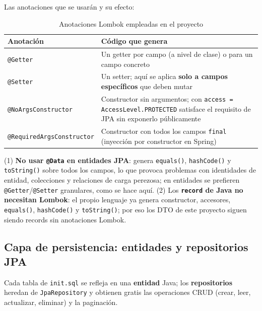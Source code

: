 \documentclass[11pt,a4paper]{article}
\begin{document}
Las anotaciones que se usarán y su efecto:

\begin{table}[h!]
\centering
\caption{Anotaciones Lombok empleadas en el proyecto}
\small
\begin{tabular}{l p{9.6cm}}
\toprule
\textbf{Anotación} & \textbf{Código que genera} \\
\midrule
\texttt{@Getter} & Un getter por campo (a nivel de clase) o para un campo concreto \\
\texttt{@Setter} & Un setter; aquí se aplica \textbf{solo a campos específicos} que deben mutar \\
\texttt{@NoArgsConstructor} & Constructor sin argumentos; con \texttt{access = AccessLevel.PROTECTED} satisface el requisito de JPA sin exponerlo públicamente \\
\texttt{@RequiredArgsConstructor} & Constructor con todos los campos \texttt{final} (inyección por constructor en Spring) \\
\bottomrule
\end{tabular}
\end{table}

\begin{cajaalerta}
(1) \textbf{No usar \texttt{@Data} en entidades JPA}: genera \texttt{equals()}, \texttt{hashCode()} y \texttt{toString()} sobre todos los campos, lo que provoca problemas con identidades de entidad, colecciones y relaciones de carga perezosa; en entidades se prefieren \texttt{@Getter}/\texttt{@Setter} granulares, como se hace aquí. (2) Los \textbf{\texttt{record} de Java no necesitan Lombok}: el propio lenguaje ya genera constructor, accesores, \texttt{equals()}, \texttt{hashCode()} y \texttt{toString()}; por eso los DTO de este proyecto siguen siendo records sin anotaciones Lombok.
\end{cajaalerta}

\subsection{Capa de persistencia: entidades y repositorios JPA}

Cada tabla de \texttt{init.sql} se refleja en una \textbf{entidad} Java; los \textbf{repositorios} heredan de \texttt{JpaRepository} y obtienen gratis las operaciones CRUD (crear, leer, actualizar, eliminar) y la paginación.
\end{document}
